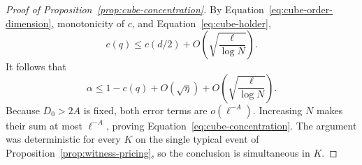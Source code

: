 \begin{proof}[Proof of Proposition~\ref{prop:cube-concentration}]
By Equation~\eqref{eq:cube-order-dimension}, monotonicity of \(c\),
and Equation~\eqref{eq:cube-holder},
\[
 c(q)\le c(d/2)+O\!\left(\sqrt{\frac{\ell}{\log N}}\right).
\]
It follows that
\[
 \alpha\le 1-c(q)+O(\sqrt\eta)
                    +O\!\left(\sqrt{\frac{\ell}{\log N}}\right).
\]
Because \(D_0>2A\) is fixed, both error terms are
\(o(\ell^{-A})\). Increasing \(N\) makes their sum at most
\(\ell^{-A}\), proving Equation~\eqref{eq:cube-concentration}.
The argument was deterministic for every \(K\) on the single typical
event of Proposition~\ref{prop:witness-pricing}, so the conclusion
is simultaneous in \(K\).
\end{proof}
